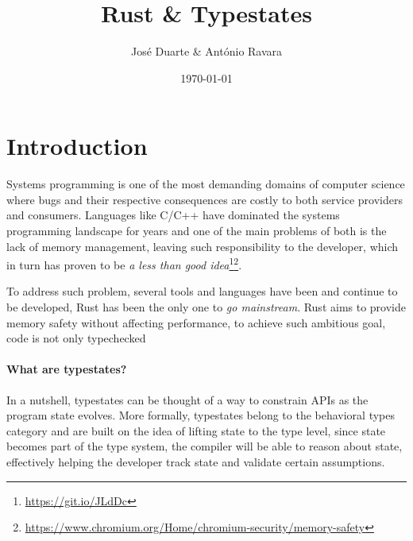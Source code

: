 \documentclass{article}
\title{Rust \& Typestates}
\author{José Duarte \& António Ravara}
\date{\today}
\begin{document}
\maketitle


\section*{Introduction}

%

Systems programming is one of the most demanding domains of computer science where
bugs and their respective consequences are costly to both service providers and consumers.
Languages like C/C++ have dominated the systems programming landscape for years and
one of the main problems of both is the lack of memory management,
leaving such responsibility to the developer,
which in turn has proven to be \emph{a less than good idea}\footnote{\url{https://git.io/JLdDc}}\footnote{\url{https://www.chromium.org/Home/chromium-security/memory-safety}}.

To address such problem, several tools and languages have been and continue to be developed,
Rust has been the only one to \emph{go mainstream}.
Rust aims to provide memory safety without affecting performance,
to achieve such ambitious goal, code is not only typechecked

\paragraph{What are typestates?}

In a nutshell, typestates can be thought of a way to constrain APIs as the program state evolves.
More formally, typestates belong to the behavioral types category and are built on the idea of lifting state to the type level,
since state becomes part of the type system, the compiler will be able to reason about state,
effectively helping the developer track state and validate certain assumptions.
\end{document}
